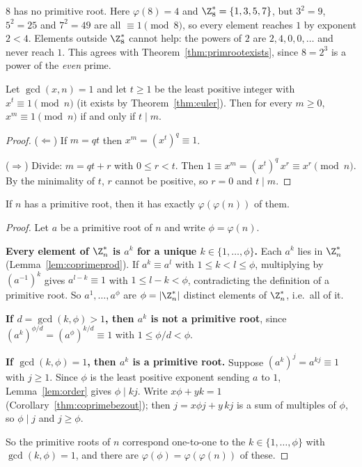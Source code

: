 \begin{example}
$8$ has no primitive root. Here $\varphi(8)=4$ and $\Z_8^*=\{1,3,5,7\}$, but $3^2=9$, $5^2=25$ and $7^2=49$ are all $\equiv1\pmod8$, so every element reaches $1$ by exponent $2<4$. Elements outside $\Z_8^*$ cannot help: the powers of $2$ are $2,4,0,0,\dots$ and never reach $1$. This agrees with Theorem~\ref{thm:primrootexists}, since $8=2^3$ is a power of the \emph{even} prime.
\end{example}

\bigskip
\begin{lemma}
\label{lem:order}
Let $\gcd(x,n)=1$ and let $t\ge1$ be the least positive integer with $x^t\equiv1\pmod n$ (it exists by Theorem~\ref{thm:euler}). Then for every $m\ge0$, \ $x^m\equiv1\pmod n$ if and only if $t\mid m$.
\end{lemma}
\begin{proof}
($\Leftarrow$) If $m=qt$ then $x^m=(x^t)^q\equiv1$.

($\Rightarrow$) Divide: $m=qt+r$ with $0\le r<t$. Then $1\equiv x^m=(x^t)^q\,x^r\equiv x^r\pmod n$. By the minimality of $t$, $r$ cannot be positive, so $r=0$ and $t\mid m$.
\end{proof}

\begin{theorem}
\label{thm:primrootcount}
If $n$ has a primitive root, then it has exactly $\varphi(\varphi(n))$ of them.
\end{theorem}
\begin{proof}
Let $a$ be a primitive root of $n$ and write $\phi=\varphi(n)$.

\textbf{Every element of $\Z_n^*$ is $a^k$ for a unique $k\in\{1,\dots,\phi\}$.} Each $a^k$ lies in $\Z_n^*$ (Lemma~\ref{lem:coprimeprod}). If $a^k\equiv a^l$ with $1\le k<l\le\phi$, multiplying by $(a^{-1})^k$ gives $a^{l-k}\equiv1$ with $1\le l-k<\phi$, contradicting the definition of a primitive root. So $a^1,\dots,a^\phi$ are $\phi=|\Z_n^*|$ distinct elements of $\Z_n^*$, i.e.\ all of it.

\textbf{If $d=\gcd(k,\phi)>1$, then $a^k$ is not a primitive root}, since $(a^k)^{\phi/d}=(a^{\phi})^{k/d}\equiv1$ with $1\le\phi/d<\phi$.

\textbf{If $\gcd(k,\phi)=1$, then $a^k$ is a primitive root.} Suppose $(a^k)^j=a^{kj}\equiv1$ with $j\ge1$. Since $\phi$ is the least positive exponent sending $a$ to $1$, Lemma~\ref{lem:order} gives $\phi\mid kj$. Write $x\phi+yk=1$ (Corollary~\ref{thm:coprimebezout}); then $j=x\phi j+y\,kj$ is a sum of multiples of $\phi$, so $\phi\mid j$ and $j\ge\phi$.

So the primitive roots of $n$ correspond one-to-one to the $k\in\{1,\dots,\phi\}$ with $\gcd(k,\phi)=1$, and there are $\varphi(\phi)=\varphi(\varphi(n))$ of these.
\end{proof}

